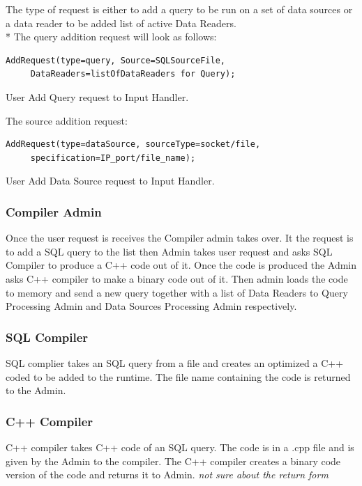 \documentclass[11pt]{article}
\begin{document}
The type of request is either to add a query to be run on a set of data sources or a data reader to be added list of active Data Readers.
\\*
The query addition request will look as follows:

\begin{code}
  \begin{verbatim}
AddRequest(type=query, Source=SQLSourceFile,
     DataReaders=listOfDataReaders for Query);
  \end{verbatim}
  \caption{User Add Query request to Input Handler.}
\end{code}

The source addition request:

\begin{code}
  \begin{verbatim}
AddRequest(type=dataSource, sourceType=socket/file,
     specification=IP_port/file_name);
  \end{verbatim}
  \caption{User Add Data Source request to Input Handler.}
\end{code}


\subsubsection{Compiler Admin}

Once the user request is receives the Compiler admin takes over. It the request is to add a SQL query to the list then Admin takes user request and asks SQL Compiler to produce a C++ code out of it. Once the code is produced the Admin asks C++ compiler to make a binary code out of it. Then admin loads the code to memory and send a new query together with a list of Data Readers to Query Processing Admin and Data Sources Processing Admin respectively.

\subsubsection{SQL Compiler}

SQL complier takes an SQL query from a file and creates an optimized a C++ coded to be added to the runtime. The file name containing the code is returned to the Admin.

\subsubsection{C++ Compiler}

C++ compiler takes C++ code of an SQL query. The code is in a .cpp file and is given by the Admin to the compiler. The C++ compiler creates a binary code version of the code and returns it to Admin. \emph{not sure about the return form}
\end{document}

